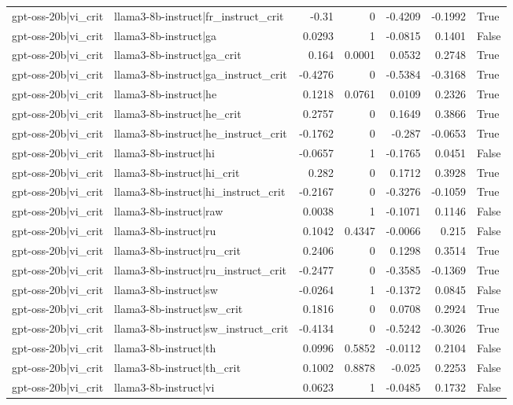 \begin{table}
\begin{tabular}{l l r r r r l}
gpt-oss-20b|vi_crit & llama3-8b-instruct|fr_instruct_crit & -0.31 & 0 & -0.4209 & -0.1992 & True \\
gpt-oss-20b|vi_crit & llama3-8b-instruct|ga & 0.0293 & 1 & -0.0815 & 0.1401 & False \\
gpt-oss-20b|vi_crit & llama3-8b-instruct|ga_crit & 0.164 & 0.0001 & 0.0532 & 0.2748 & True \\
gpt-oss-20b|vi_crit & llama3-8b-instruct|ga_instruct_crit & -0.4276 & 0 & -0.5384 & -0.3168 & True \\
gpt-oss-20b|vi_crit & llama3-8b-instruct|he & 0.1218 & 0.0761 & 0.0109 & 0.2326 & True \\
gpt-oss-20b|vi_crit & llama3-8b-instruct|he_crit & 0.2757 & 0 & 0.1649 & 0.3866 & True \\
gpt-oss-20b|vi_crit & llama3-8b-instruct|he_instruct_crit & -0.1762 & 0 & -0.287 & -0.0653 & True \\
gpt-oss-20b|vi_crit & llama3-8b-instruct|hi & -0.0657 & 1 & -0.1765 & 0.0451 & False \\
gpt-oss-20b|vi_crit & llama3-8b-instruct|hi_crit & 0.282 & 0 & 0.1712 & 0.3928 & True \\
gpt-oss-20b|vi_crit & llama3-8b-instruct|hi_instruct_crit & -0.2167 & 0 & -0.3276 & -0.1059 & True \\
gpt-oss-20b|vi_crit & llama3-8b-instruct|raw & 0.0038 & 1 & -0.1071 & 0.1146 & False \\
gpt-oss-20b|vi_crit & llama3-8b-instruct|ru & 0.1042 & 0.4347 & -0.0066 & 0.215 & False \\
gpt-oss-20b|vi_crit & llama3-8b-instruct|ru_crit & 0.2406 & 0 & 0.1298 & 0.3514 & True \\
gpt-oss-20b|vi_crit & llama3-8b-instruct|ru_instruct_crit & -0.2477 & 0 & -0.3585 & -0.1369 & True \\
gpt-oss-20b|vi_crit & llama3-8b-instruct|sw & -0.0264 & 1 & -0.1372 & 0.0845 & False \\
gpt-oss-20b|vi_crit & llama3-8b-instruct|sw_crit & 0.1816 & 0 & 0.0708 & 0.2924 & True \\
gpt-oss-20b|vi_crit & llama3-8b-instruct|sw_instruct_crit & -0.4134 & 0 & -0.5242 & -0.3026 & True \\
gpt-oss-20b|vi_crit & llama3-8b-instruct|th & 0.0996 & 0.5852 & -0.0112 & 0.2104 & False \\
gpt-oss-20b|vi_crit & llama3-8b-instruct|th_crit & 0.1002 & 0.8878 & -0.025 & 0.2253 & False \\
gpt-oss-20b|vi_crit & llama3-8b-instruct|vi & 0.0623 & 1 & -0.0485 & 0.1732 & False \\

\end{tabular}
\end{table}
